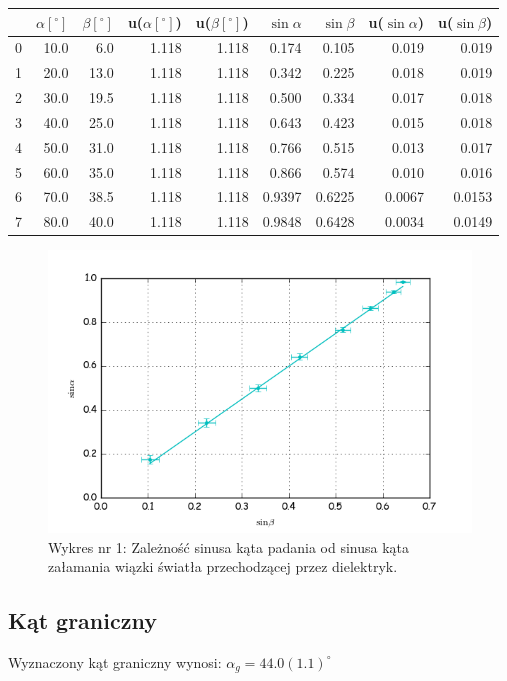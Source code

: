 \documentclass[a4paper,10pt]{article}
\begin{document}
\begin{tabular}{lrrrrrrrr}
\hline
{}&$\alpha[^\circ]$&$\beta[^\circ]$&u($\alpha[^\circ]$)&u($\beta[^\circ]$)&$\sin{\alpha}$&$\sin{\beta}$&u($\sin{\alpha}$)&u($\sin{\beta}$) \\
\hline
0 & 10.0 &  6.0 & 1.118 & 1.118 & 0.174 & 0.105 & 0.019 & 0.019 \\
1 & 20.0 & 13.0 & 1.118 & 1.118 & 0.342 & 0.225 & 0.018 & 0.019 \\
2 & 30.0 & 19.5 & 1.118 & 1.118 & 0.500 & 0.334 & 0.017 & 0.018 \\
3 & 40.0 & 25.0 & 1.118 & 1.118 & 0.643 & 0.423 & 0.015 & 0.018 \\
4 & 50.0 & 31.0 & 1.118 & 1.118 & 0.766 & 0.515 & 0.013 & 0.017 \\
5 & 60.0 & 35.0 & 1.118 & 1.118 & 0.866 & 0.574 & 0.010 & 0.016 \\
6 & 70.0 & 38.5 & 1.118 & 1.118 & 0.9397 & 0.6225 & 0.0067 & 0.0153 \\
7 & 80.0 & 40.0 & 1.118 & 1.118 & 0.9848 & 0.6428 & 0.0034 & 0.0149 \\
\hline
\end{tabular}

\begin{figure}[H]
  \includegraphics{./snella.png}
  \caption{Wykres nr 1: Zależność sinusa kąta padania od sinusa kąta załamania wiązki światła przechodzącej przez dielektryk.}
\end{figure}

\subsection{Kąt graniczny}
Wyznaczony kąt graniczny wynosi: $\alpha_g = 44.0(1.1)^\circ$
\end{document}
